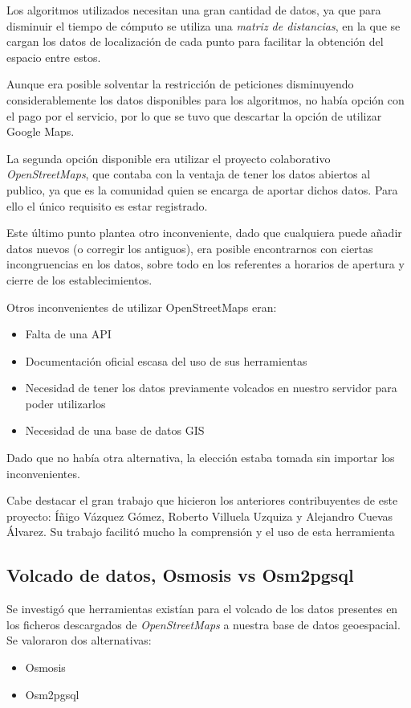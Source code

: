 Los algoritmos utilizados necesitan una gran cantidad de datos, ya que para disminuir el tiempo de cómputo se utiliza una \textit{matriz de distancias}, en la que se cargan los datos de localización de cada punto para facilitar la obtención del espacio entre estos.

Aunque era posible solventar la restricción de peticiones disminuyendo considerablemente los datos disponibles para los algoritmos, no había opción con el pago por el servicio, por lo que se tuvo que descartar la opción de utilizar Google Maps.

La segunda opción disponible era utilizar el proyecto colaborativo \textit{OpenStreetMaps}\cite{wiki:openstreetmaps}, que contaba con la ventaja de tener los datos abiertos al publico, ya que es la comunidad quien se encarga de aportar dichos datos. Para ello el único requisito es estar registrado.

Este último punto plantea otro inconveniente, dado que cualquiera puede añadir datos nuevos (o corregir los antiguos), era posible encontrarnos con ciertas incongruencias en los datos, sobre todo en los referentes a horarios de apertura y cierre de los establecimientos.

Otros inconvenientes de utilizar OpenStreetMaps eran:
\begin{itemize}
\tightlist
\item Falta de una API
\item Documentación oficial escasa del uso de sus herramientas
\item Necesidad de tener los datos previamente volcados en nuestro servidor para poder utilizarlos
\item Necesidad de una base de datos GIS
\end{itemize}

Dado que no había otra alternativa, la elección estaba tomada sin importar los inconvenientes. 

Cabe destacar el gran trabajo que hicieron los anteriores contribuyentes de este proyecto: Íñigo Vázquez Gómez, Roberto Villuela Uzquiza y Alejandro Cuevas Álvarez. Su trabajo facilitó mucho la comprensión y el uso de esta herramienta

\subsection{Volcado de datos, Osmosis vs Osm2pgsql}
Se investigó que herramientas existían para el volcado de los datos presentes en los ficheros descargados de \textit{OpenStreetMaps} a nuestra base de datos geoespacial. Se valoraron dos alternativas:
\begin{itemize}
\item Osmosis
\item Osm2pgsql
\end{itemize}

